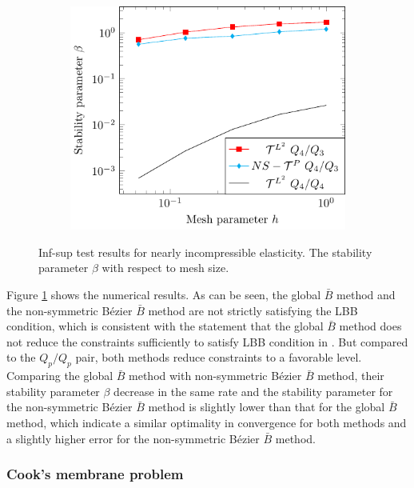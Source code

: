 \documentclass{article}
\newcommand{\Bezier}{{B\'{e}zier} }
\begin{document}
\begin{figure}[htb!]
\begin{subfigure}[b]{0.31\linewidth}
    \end{subfigure}
    \begin{subfigure}[b]{0.31\linewidth}        %
        \centering
        \includegraphics[width=\linewidth]{beta_p_4}
    \end{subfigure}

    \caption{Inf-sup test results for nearly incompressible elasticity. The stability parameter $\beta$ with respect to mesh size.}
    \label{fig:inf_sup}
\end{figure}

Figure \ref{fig:inf_sup} shows the numerical results. As can be seen, the global $\bar{B}$ method and the non-symmetric \Bezier $\bar{B}$ method are not strictly satisfying the LBB condition, which is consistent with the statement that the global $\bar{B}$ method does not reduce the constraints sufficiently to satisfy LBB condition in \cite{elguedj:hal-00457010}. But compared to the $Q_p/Q_p$ pair, both methods reduce constraints to a favorable level. Comparing the global $\bar{B}$ method with non-symmetric \Bezier $\bar{B}$ method, their stability parameter $\beta$ decrease in the same rate and the stability parameter for the non-symmetric \Bezier $\bar{B}$ method is slightly lower than that for the global $\bar{B}$ method, which indicate a similar optimality in convergence for both methods and a slightly higher error for the non-symmetric \Bezier $\bar{B}$ method.

\subsubsection{Cook's membrane problem}
\end{document}
